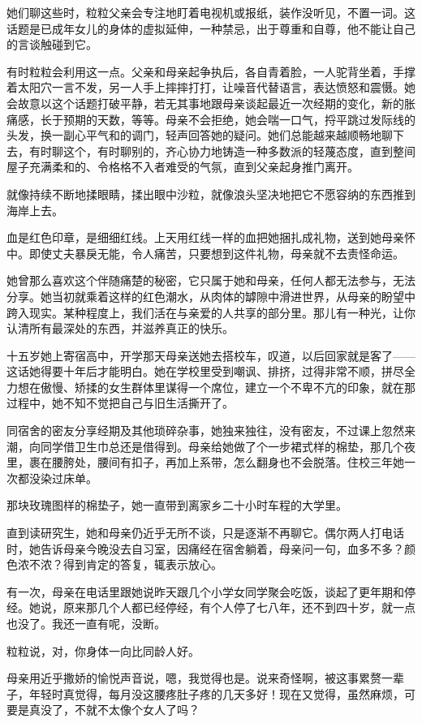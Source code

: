 \documentclass[lang=cn,newtx,12pt,scheme=chinese]{elegantbook}
\begin{document}
她们聊这些时，粒粒父亲会专注地盯着电视机或报纸，装作没听见，不置一词。这话题是已成年女儿的身体的虚拟延伸，一种禁忌，出于尊重和自尊，他不能让自己的言谈触碰到它。

有时粒粒会利用这一点。父亲和母亲起争执后，各自青着脸，一人驼背坐着，手撑着太阳穴一言不发，另一人手上摔摔打打，让噪音代替语言，表达愤怒和震慑。她会故意以这个话题打破平静，若无其事地跟母亲谈起最近一次经期的变化，新的胀痛感，长于预期的天数，等等。母亲不会拒绝，她会喘一口气，捋平跳过发际线的头发，换一副心平气和的调门，轻声回答她的疑问。她们总能越来越顺畅地聊下去，有时聊这个，有时聊别的，齐心协力地铸造一种多数派的轻蔑态度，直到整间屋子充满柔和的、令格格不入者难受的气氛，直到父亲起身推门离开。

就像持续不断地揉眼睛，揉出眼中沙粒，就像浪头坚决地把它不愿容纳的东西推到海岸上去。

血是红色印章，是细细红线。上天用红线一样的血把她捆扎成礼物，送到她母亲怀中。即使丈夫暴戾无能，令人痛苦，只要想到这件礼物，母亲就不去责怪命运。

她曾那么喜欢这个伴随痛楚的秘密，它只属于她和母亲，任何人都无法参与，无法分享。她当初就乘着这样的红色潮水，从肉体的罅隙中滑进世界，从母亲的盼望中跨入现实。某种程度上，我们活在与亲爱的人共享的部分里。那儿有一种光，让你认清所有最深处的东西，并滋养真正的快乐。

十五岁她上寄宿高中，开学那天母亲送她去搭校车，叹道，以后回家就是客了——这话她得要十年后才能明白。她在学校里受到嘲讽、排挤，过得非常不顺，拼尽全力想在傲慢、矫揉的女生群体里谋得一个席位，建立一个不卑不亢的印象，就在那过程中，她不知不觉把自己与旧生活撕开了。

同宿舍的密友分享经期及其他琐碎杂事，她独来独往，没有密友，不过课上忽然来潮，向同学借卫生巾总还是借得到。母亲给她做了个一步裙式样的棉垫，那几个夜里，裹在腰胯处，腰间有扣子，再加上系带，怎么翻身也不会脱落。住校三年她一次都没染过床单。

那块玫瑰图样的棉垫子，她一直带到离家乡二十小时车程的大学里。

直到读研究生，她和母亲仍近乎无所不谈，只是逐渐不再聊它。偶尔两人打电话时，她告诉母亲今晚没去自习室，因痛经在宿舍躺着，母亲问一句，血多不多？颜色浓不浓？得到肯定的答复，辄表示放心。

有一次，母亲在电话里跟她说昨天跟几个小学女同学聚会吃饭，谈起了更年期和停经。她说，原来那几个人都已经停经，有个人停了七八年，还不到四十岁，就一点也没了。我还一直有呢，没断。

粒粒说，对，你身体一向比同龄人好。

母亲用近乎撒娇的愉悦声音说，嗯，我觉得也是。说来奇怪啊，被这事累赘一辈子，年轻时真觉得，每月没这腰疼肚子疼的几天多好！现在又觉得，虽然麻烦，可要是真没了，不就不太像个女人了吗？
\end{document}
